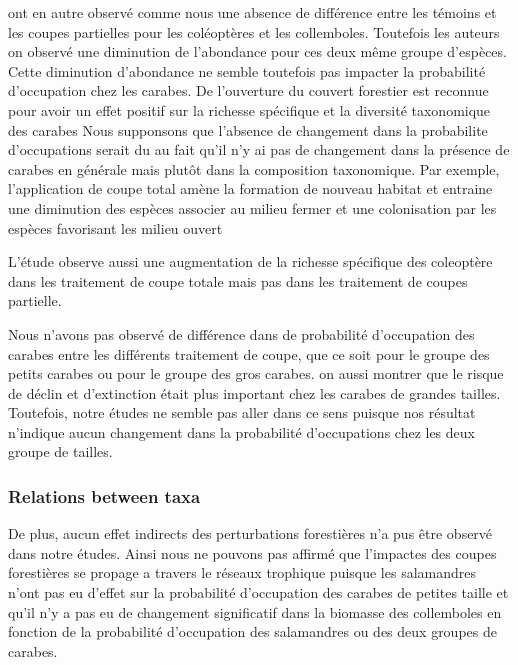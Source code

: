 \cite{Kudrin2023metaanalysiseffects} ont en autre observé comme nous une absence de différence entre les témoins et les coupes partielles pour les coléoptères et les collemboles.
Toutefois les auteurs on observé une diminution de l'abondance pour ces deux même groupe d'espèces.
Cette diminution d'abondance ne semble toutefois pas impacter la probabilité d'occupation chez les carabes. 
De l'ouverture du couvert forestier est reconnue pour avoir un effet positif sur la richesse spécifique et la diversité taxonomique des carabes \citep{Kudrin2023metaanalysiseffects}
Nous supponsons que l'absence de changement dans la probabilite d'occupations serait du au fait qu'il n'y ai pas de changement dans la présence de carabes en générale mais plutôt dans la composition taxonomique.
Par exemple, l'application de coupe total amène la formation de nouveau habitat et entraine une diminution des espèces associer au milieu fermer et une colonisation par les espèces favorisant les milieu ouvert \citep{Niemela2007effectsforestry,Pohl2007Rovebeetles}

L'étude observe aussi une augmentation de la richesse spécifique des coleoptère dans les traitement de coupe totale mais pas dans les traitement de coupes partielle. 


Nous n'avons pas observé de différence dans de probabilité d'occupation des carabes entre les différents traitement de coupe, que ce soit pour le groupe des petits carabes ou pour le groupe des gros carabes.
\cite{Nolte2019Habitatspecialization} on aussi montrer que le risque de déclin et d'extinction était plus important chez les carabes de grandes tailles.
Toutefois, notre études ne semble pas aller dans ce sens puisque nos résultat n'indique aucun changement dans la probabilité d'occupations chez les deux groupe de tailles. 



\subsubsection*{Relations between taxa}
\label{disc:relations_between_taxa}

De plus, aucun effet indirects des perturbations forestières n'a pus être observé dans notre études.
Ainsi nous ne pouvons pas affirmé que l'impactes des coupes forestières se propage a travers le réseaux trophique puisque les salamandres 
n'ont pas eu d'effet sur la probabilité d'occupation des carabes de petites taille et qu'il n'y a pas eu de changement significatif 
dans la biomasse des collemboles en fonction de la probabilité d'occupation des salamandres ou des deux groupes de carabes. 


